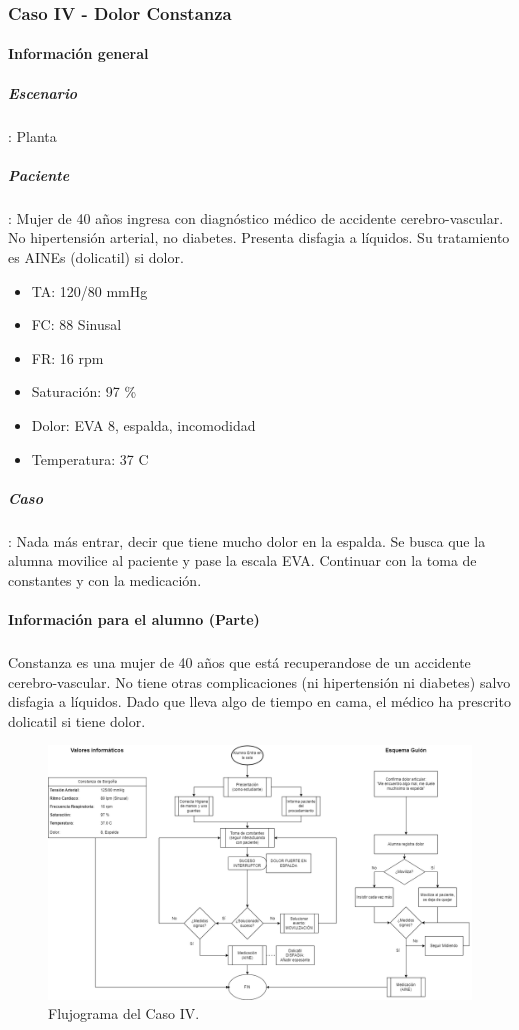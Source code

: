 \subsubsection{Caso IV - Dolor Constanza}
\begin{multicols}{2}
    \paragraph{Información general}
    \subparagraph{Escenario}: Planta
    \subparagraph{Paciente}: Mujer de 40 años ingresa con diagnóstico médico de accidente cerebro-vascular. No hipertensión arterial, no diabetes. Presenta disfagia a líquidos. Su tratamiento es AINEs (dolicatil) si dolor.
    \begin{itemize}[topsep=0pt, partopsep=0pt,itemsep=0pt,parsep=0pt]
        \item TA: 120/80 mmHg
        \item FC: 88 Sinusal
        \item FR: 16 rpm
        \item Saturación: 97 \%
        \item Dolor: EVA 8, espalda, incomodidad
        \item Temperatura: 37 C
    \end{itemize}
    \subparagraph{Caso}: Nada más entrar, decir que tiene mucho dolor en la espalda. Se busca que la alumna movilice al paciente y pase la escala EVA. Continuar con la toma de constantes y con la medicación.
    \columnbreak
    \paragraph{Información para el alumno (Parte)}
    \subparagraph{} Constanza es una mujer de 40 años que está recuperandose de un accidente cerebro-vascular. No tiene otras complicaciones (ni hipertensión ni diabetes) salvo disfagia a líquidos. Dado que lleva algo de tiempo en cama, el médico ha prescrito dolicatil si tiene dolor.
\end{multicols}
\begin{figure}[H]
    \centering
	\includegraphics[width=\textwidth]{./imagenes/ACV-AdSC-CasoIVDiagramaFlujoIIEnf.png}
	\caption{\label{fig:PlanXVII:CasoIV}Flujograma del Caso IV.}
\end{figure}
\clearpage
